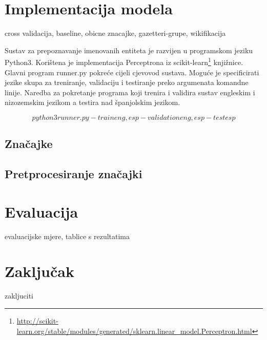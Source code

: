 \documentclass[times, utf8, seminar]{fer}
\begin{document}
\chapter{Implementacija modela}
cross validacija, baseline, obicne znacajke, gazetteri-grupe, wikifikacija

Sustav za prepoznavanje imenovanih entiteta je razvijen u programskom jeziku Python3. Korištena je implementacija Perceptrona iz scikit-learn\footnote{\url{http://scikit-learn.org/stable/modules/generated/sklearn.linear_model.Perceptron.html}} knjižnice. 
Glavni program runner.py pokreće cijeli cjevovod sustava. Moguće je specificirati jezike skupa za treniranje, validaciju i testiranje preko argumenata komandne linije. Naredba za pokretanje programa koji trenira i validira sustav engleskim i nizozemskim jezikom a testira nad španjolskim jezikom.

\[ python3  runner.py -train eng,esp -validation eng,esp -test esp \]
\section{Značajke}

\section{Pretprocesiranje značajki}

\chapter{Evaluacija}
evaluacijske mjere, tablice s rezultatima
\chapter{Zaključak}
zakljuciti


\nocite{*}

\begin{sazetak}


\kljucnerijeci{}
\end{sazetak}
\begin{abstract}


\keywords{}
\end{abstract}
\end{document}
